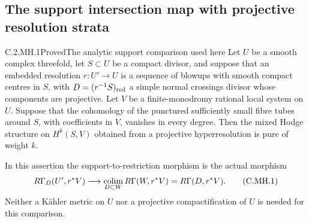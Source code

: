 \subsection{The support intersection map with projective resolution strata}

\begin{statement}{C.2.MH.1}{Proved}{The analytic support comparison used here}
Let $U$ be a smooth complex threefold, let $S\subset U$ be a
compact divisor, and suppose that an embedded resolution
$r:U'\to U$ is a sequence of blowups with smooth compact
centres in $S$, with $D=(r^{-1}S)_{\rm red}$ a simple
normal crossings divisor whose components are projective.
Let $V$ be a finite-monodromy rational local system on $U$.
Suppose that the cohomology of the punctured sufficiently
small fibre tubes around $S$, with coefficients in $V$,
vanishes in every degree. Then the mixed Hodge structure
on $H^k(S,V)$ obtained from a projective hyperresolution
is pure of weight $k$.

In this assertion the support-to-restriction morphism is
the actual morphism
\[
 R\Gamma_D(U',r^*V)\longrightarrow
 \underset{D\subset W}{\mathop{\rm colim}}\,
 R\Gamma(W,r^*V)=R\Gamma(D,r^*V).
 \tag{C.MH.1}
\]
Neither a K\"ahler metric on $U$ nor a projective
compactification of $U$ is needed for this comparison.
\end{statement}
